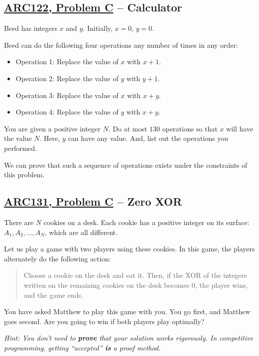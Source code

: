\documentclass[12pt]{article}
\begin{document}
\subsection{\href{https://atcoder.jp/contests/arc122/tasks/arc122_c}{ARC122, Problem C} -- Calculator}

Beed has integers $x$ and $y$. Initially, $x=0$, $y=0$.

Beed can do the following four operations any number of times in any order:

\begin{itemize}
    \item Operation 1: Replace the value of $x$ with $x+1$.
    \item Operation 2: Replace the value of $y$ with $y+1$.
    \item Operation 3: Replace the value of $x$ with $x+y$.
    \item Operation 4: Replace the value of $y$ with $x+y$.
\end{itemize}

You are given a positive integer $N$. Do at most $130$ operations so that $x$ will have the value $N$. Here, $y$ can have any value. And, list out the operations you performed.

We can prove that such a sequence of operations exists under the constraints of this problem.

\subsection{\href{https://atcoder.jp/contests/arc131/tasks/arc131_c}{ARC131, Problem C} -- Zero XOR}

There are $N$ cookies on a desk. Each cookie has a positive integer on its surface: $A_1, A_2, \ldots, A_N$, which are all different.

Let us play a game with two players using these cookies. In this game, the players alternately do the following action:

\begin{quote}
Choose a cookie on the desk and eat it. Then, if the $\text{XOR}$ of the integers written on the remaining cookies on the desk becomes $0$, the player wins, and the game ends.
\end{quote}

You have asked Matthew to play this game with you. You go first, and Matthew goes second. Are you going to win if both players play optimally?

\textit{Hint: You don't need to \textbf{prove} that your solution works rigorously. In competitive programming, getting ``accepted'' \textbf{is} a proof method.}
\end{document}
